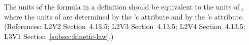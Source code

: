 The units of the  formula in a \KineticLaw definition should be
equivalent to the units of , where the units of
 are determined by the \Model's 
attribute and  by the \Model's  attribute.
(References: L2V2 Section~4.13.5; L2V3 Section~4.13.5; L2V4 Section~4.13.5;
L3V1 Section~\ref{subsec:kinetic-law}.)
